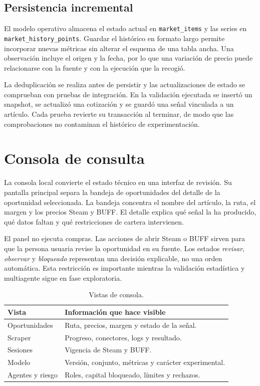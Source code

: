 \subsection{Persistencia incremental}

El modelo operativo almacena el estado actual en \texttt{market\_items} y las series en \texttt{market\_history\_points}. Guardar el histórico en formato largo permite incorporar nuevas métricas sin alterar el esquema de una tabla ancha. Una observación incluye el origen y la fecha, por lo que una variación de precio puede relacionarse con la fuente y con la ejecución que la recogió.

La deduplicación se realiza antes de persistir y las actualizaciones de estado se comprueban con pruebas de integración. En la validación ejecutada se insertó un snapshot, se actualizó una cotización y se guardó una señal vinculada a un artículo. Cada prueba revierte su transacción al terminar, de modo que las comprobaciones no contaminan el histórico de experimentación.

\section{Consola de consulta}

La consola local convierte el estado técnico en una interfaz de revisión. Su pantalla principal separa la bandeja de oportunidades del detalle de la oportunidad seleccionada. La bandeja concentra el nombre del artículo, la ruta, el margen y los precios Steam y BUFF. El detalle explica qué señal la ha producido, qué datos faltan y qué restricciones de cartera intervienen.

El panel no ejecuta compras. Las acciones de abrir Steam o BUFF sirven para que la persona usuaria revise la oportunidad en su fuente. Los estados \emph{revisar}, \emph{observar} y \emph{bloqueado} representan una decisión explicable, no una orden automática. Esta restricción es importante mientras la validación estadística y multiagente sigue en fase exploratoria.

\begin{table}[h]
\centering
\begin{tabularx}{\textwidth}{>{\raggedright\arraybackslash}p{} >{\raggedright\arraybackslash}X}
\toprule
Vista & Información que hace visible \\
\midrule
Oportunidades & Ruta, precios, margen y estado de la señal. \\
Scraper & Progreso, conectores, logs y resultado. \\
Sesiones & Vigencia de Steam y BUFF. \\
Modelo & Versión, conjunto, métricas y carácter experimental. \\
Agentes y riesgo & Roles, capital bloqueado, límites y rechazos. \\
\bottomrule
\end{tabularx}
\caption{Vistas de consola.}
\label{tab:vistas-consola}
\end{table}

